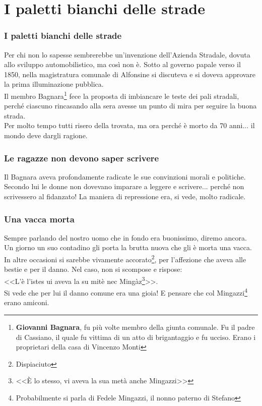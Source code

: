 
\chapter{I paletti bianchi delle strade}
\subsection{I paletti bianchi delle strade}
Per chi non lo sapesse sembrerebbe un'invenzione dell'Azienda Stradale, dovuta allo sviluppo automobilistico, ma così non è. Sotto al governo papale verso il 1850, nella magistratura comunale di Alfonsine si discuteva e si doveva approvare la prima illuminazione pubblica.\\
\indent Il membro Bagnara\footnote{\textbf{Giovanni Bagnara}, fu più volte membro della giunta comunale. Fu il padre di Cassiano, il quale fu vittima di un atto di brigantaggio e fu ucciso. Erano i proprietari della casa di Vincenzo Monti} fece la proposta di imbiancare le teste dei pali stradali, perché ciascuno rincasando alla sera avesse un punto di mira per seguire la buona strada.\\
\indent Per molto tempo tutti risero della trovata, ma ora perché è morto da 70 anni... il mondo deve dargli ragione.

\subsection{Le ragazze non devono saper scrivere}
Il Bagnara aveva profondamente radicate le sue convinzioni morali e politiche. Secondo lui le donne non dovevano imparare a leggere e scrivere... perché non scrivessero al fidanzato! La maniera di repressione era, si vede, molto radicale.\\

\subsection{Una vacca morta}
Sempre parlando del nostro uomo che in fondo era buonissimo, diremo ancora.\\
\indent Un giorno un suo contadino gli porta la brutta nuova che gli è morta una vacca. In altre occasioni si sarebbe vivamente accorato\footnote{Dispiaciuto}, per l'affezione che aveva alle bestie e per il danno. Nel caso, non si scompose e rispose:\\
\indent <<L'è l'istes ui aveva la su mitè nec Mingàz\footnote{<<È lo stesso, vi aveva la sua metà anche Mingazzi>>}>>. \\
\indent Si vede che per lui il danno comune era una gioia! E pensare che col Mingazzi\footnote{Probabilmente si parla di Fedele Mingazzi, il nonno paterno di Stefano} erano amiconi.


